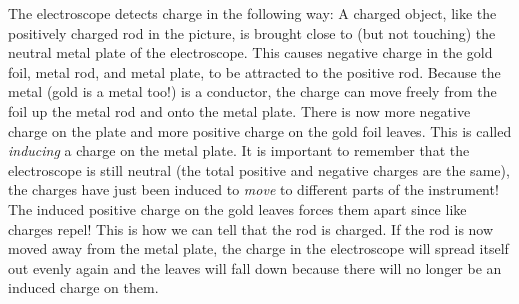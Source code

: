         \par 
        \label{m38781*id200552}The electroscope detects charge in the following way: A charged object, like the positively charged rod in the picture, is brought close to (but not touching) the neutral metal plate of the electroscope. This causes negative charge in the gold foil, metal rod, and metal plate, to be attracted to the positive rod. Because the metal (gold is a metal too!) is a conductor, the charge can move freely from the foil up the metal rod and onto the metal plate. There is now more negative charge on the plate and more positive charge on the gold foil leaves. This is called \textsl{inducing} a charge on the metal plate. It is important to remember that the electroscope is still neutral (the total positive and negative charges are the same), the charges have just been induced to \textsl{move} to different parts of the instrument! The induced positive charge on the gold leaves forces them apart since like charges repel! This is how we can tell that the rod is charged. If the rod is now moved away from the metal plate, the charge in the electroscope will spread itself out evenly again and the leaves will fall down because there will no longer be an induced charge on them.\par 
        \label{m38781*uid12}
